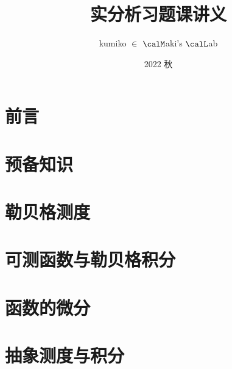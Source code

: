 \documentclass[lang=cn, color=blue]{elegantbook}
\title{实分析习题课讲义}
\subtitle{}
\author{kumiko $\in$ $\calM$aki's $\calL$ab}
\institute{$\calM$aki's $\calL$ab}
\date{2022 秋}
\begin{document}

\maketitle
\frontmatter
\chapter*{前言}




\tableofcontents


\mainmatter
\chapter{预备知识}
    
    
    
\chapter{勒贝格测度}
    
    
    
    
    
    
\chapter{可测函数与勒贝格积分}
    

    
    
    
    
    

    

\chapter{函数的微分}
    
    

\chapter{抽象测度与积分}
    
    

\end{document}
